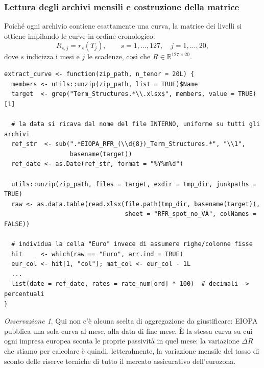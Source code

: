 \documentclass[11pt,a4paper]{article}
\theoremstyle{plain}
\theoremstyle{definition}
\theoremstyle{remark}
\newtheorem*{osservazione}{Osservazione}
\begin{document}
\subsubsection{Lettura degli archivi mensili e costruzione della matrice}
\label{sec:estrazione}

Poich\'e ogni archivio contiene esattamente una curva, la matrice dei livelli
si ottiene impilando le curve in ordine cronologico:
\[
R_{s,j} = r_s(T_j), \qquad s = 1,\ldots,127,\quad j = 1,\ldots,20,
\]
dove $s$ indicizza i mesi e $j$ le scadenze, cos\`i che
$R \in \mathbb{R}^{127 \times 20}$.

\begin{codebox}
\begin{Verbatim}[fontsize=\small]
extract_curve <- function(zip_path, n_tenor = 20L) {
  members <- utils::unzip(zip_path, list = TRUE)$Name
  target  <- grep("Term_Structures.*\\.xlsx$", members, value = TRUE)[1]

  # la data si ricava dal nome del file INTERNO, uniforme su tutti gli archivi
  ref_str  <- sub(".*EIOPA_RFR_(\\d{8})_Term_Structures.*", "\\1",
                  basename(target))
  ref_date <- as.Date(ref_str, format = "%Y%m%d")

  utils::unzip(zip_path, files = target, exdir = tmp_dir, junkpaths = TRUE)
  raw <- as.data.table(read.xlsx(file.path(tmp_dir, basename(target)),
                                 sheet = "RFR_spot_no_VA", colNames = FALSE))

  # individua la cella "Euro" invece di assumere righe/colonne fisse
  hit     <- which(raw == "Euro", arr.ind = TRUE)
  eur_col <- hit[1, "col"]; mat_col <- eur_col - 1L
  ...
  list(date = ref_date, rates = rate_num[ord] * 100)  # decimali -> percentuali
}
\end{Verbatim}
\end{codebox}

\begin{osservazione}
Qui non c'\`e alcuna scelta di aggregazione da giustificare: EIOPA pubblica una
sola curva al mese, alla data di fine mese. \`E la stessa curva su cui ogni
impresa europea sconta le proprie passivit\`a in quel mese: la variazione
$\Delta R$ che stiamo per calcolare \`e quindi, letteralmente, la variazione
mensile del tasso di sconto delle riserve tecniche di tutto il mercato
assicurativo dell'eurozona.
\end{osservazione}
\end{document}
